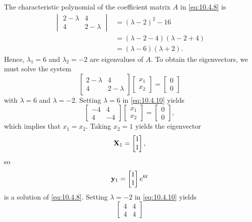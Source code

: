 \begin{alistSolution}
\item The characteristic
polynomial of the  coefficient matrix $A$ in  \eqref{eq:10.4.8} is
\begin{align*}
\begin{vmatrix} 2-\lambda&4\\4&2-\lambda\end{vmatrix}
&= (\lambda-2)^2-16\\
&= (\lambda-2-4)(\lambda-2+4)\\
&= (\lambda-6)(\lambda+2).
\end{align*}
Hence,  $\lambda_1=6$ and $\lambda_2
=-2$ are eigenvalues of $A$. To obtain the eigenvectors,
we must solve the system
\begin{equation}\label{eq:10.4.10}
\begin{bmatrix} 2-\lambda&4\\4&2-\lambda\end{bmatrix}
\begin{bmatrix} x_1\\x_2\end{bmatrix}=
\begin{bmatrix} 0\\0\end{bmatrix}
\end{equation}
with $\lambda=6$ and $\lambda=-2$.  Setting $\lambda=6$ in
\eqref{eq:10.4.10} yields
 \[
\begin{bmatrix}-4&4\\4&-4\end{bmatrix}
\begin{bmatrix}x_1\\x_2\end{bmatrix}=
\begin{bmatrix} 0\\0\end{bmatrix},
\]
which implies that $x_1=x_2$.  Taking $x_2=1$ yields the eigenvector
\[
\mathbf{X}_1=\begin{bmatrix} 1\\1\end{bmatrix},
\]
so
\[
\mathbf{y}_1=\begin{bmatrix} 1\\1\end{bmatrix}e^{6t}
\]
is a solution of  \eqref{eq:10.4.8}.  Setting $\lambda=-2$ in
\eqref{eq:10.4.10} yields
\[
\begin{bmatrix} 4&4\\4&4\end{bmatrix}
\]
\end{alistSolution}
